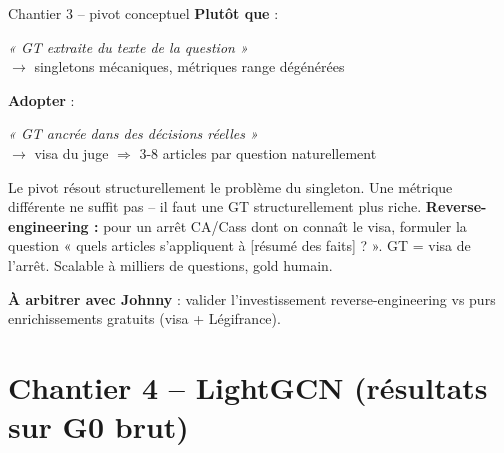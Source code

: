 \documentclass[aspectratio=169,10pt]{beamer}
\newcommand{\keybox}[1]{%
  \begin{center}
  \colorbox{accentsoft}{\parbox{0.92\linewidth}{\centering #1}}
  \end{center}}
\begin{document}
\begin{frame}{Chantier 3 -- pivot conceptuel}
  \footnotesize
  \textbf{Plutôt que} :
  \vspace{0.2em}
  \begin{center}
  \emph{« GT extraite du texte de la question »}\\
  $\to$ singletons mécaniques, métriques range dégénérées
  \end{center}

  \vspace{0.5em}
  \textbf{Adopter} :
  \begin{center}
  \emph{« GT ancrée dans des décisions réelles »}\\
  $\to$ visa du juge $\Rightarrow$ 3-8 articles par question naturellement
  \end{center}

  \vspace{0.8em}
  \keybox{Le pivot résout structurellement le problème du singleton.
  Une métrique différente ne suffit pas -- il faut une GT structurellement plus riche.
  \textbf{Reverse-engineering :} pour un arrêt CA/Cass dont on connaît le visa, formuler
  la question « quels articles s'appliquent à [résumé des faits] ? ».
  GT = visa de l'arrêt. Scalable à milliers de questions, gold humain.}

  \vspace{0.5em}
  \textbf{À arbitrer avec Johnny} : valider l'investissement reverse-engineering vs purs
  enrichissements gratuits (visa + Légifrance).
\end{frame}

\section{Chantier 4 -- LightGCN (résultats sur G0 brut)}
\end{document}

